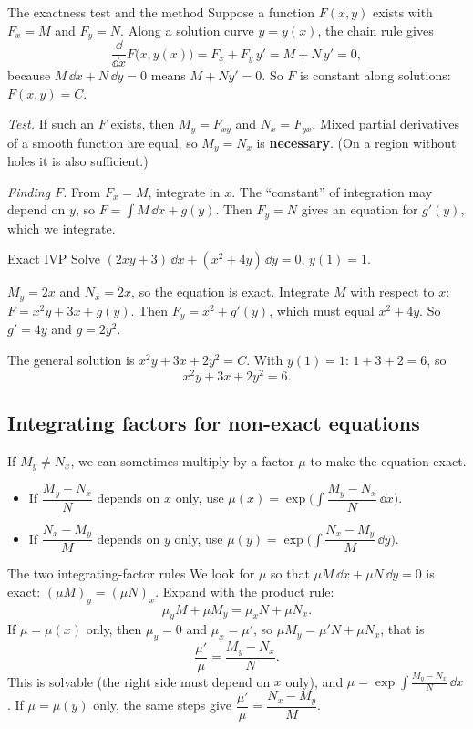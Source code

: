\begin{derivbox}{The exactness test and the method}
Suppose a function $F(x,y)$ exists with $F_x = M$ and $F_y = N$. Along a solution curve $y = y(x)$, the chain rule gives
\[ \frac{\dd}{\dd x}F\big(x,y(x)\big) = F_x + F_y\,y' = M + N\,y' = 0, \]
because $M\,\dd x + N\,\dd y = 0$ means $M + Ny' = 0$. So $F$ is constant along solutions: $F(x,y)=C$.

\emph{Test.} If such an $F$ exists, then $M_y = F_{xy}$ and $N_x = F_{yx}$. Mixed partial derivatives of a smooth function are equal, so $M_y = N_x$ is \textbf{necessary}. (On a region without holes it is also sufficient.)

\emph{Finding $F$.} From $F_x = M$, integrate in $x$. The ``constant'' of integration may depend on $y$, so $F = \int M\,\dd x + g(y)$. Then $F_y = N$ gives an equation for $g'(y)$, which we integrate.
\end{derivbox}

\begin{examplebox}{Exact IVP}
Solve $(2xy+3)\,\dd x + (x^2+4y)\,\dd y = 0$, \quad $y(1)=1$.

$M_y = 2x$ and $N_x = 2x$, so the equation is exact. Integrate $M$ with respect to $x$:
$F = x^2y + 3x + g(y)$. Then $F_y = x^2 + g'(y)$, which must equal $x^2 + 4y$. So $g' = 4y$ and $g = 2y^2$.

The general solution is $x^2y + 3x + 2y^2 = C$. With $y(1)=1$: $1+3+2 = 6$, so
\[ x^2y + 3x + 2y^2 = 6. \]
\end{examplebox}

\subsection*{Integrating factors for non-exact equations}

If $M_y \neq N_x$, we can sometimes multiply by a factor $\mu$ to make the equation exact.
\begin{itemize}
  \item If $\dfrac{M_y - N_x}{N}$ depends on $x$ only, use $\mu(x) = \exp\!\Big(\displaystyle\int \dfrac{M_y-N_x}{N}\,\dd x\Big)$.
  \item If $\dfrac{N_x - M_y}{M}$ depends on $y$ only, use $\mu(y) = \exp\!\Big(\displaystyle\int \dfrac{N_x-M_y}{M}\,\dd y\Big)$.
\end{itemize}

\begin{derivbox}{The two integrating-factor rules}
We look for $\mu$ so that $\mu M\,\dd x + \mu N\,\dd y = 0$ is exact: $(\mu M)_y = (\mu N)_x$. Expand with the product rule:
\[ \mu_yM + \mu M_y = \mu_xN + \mu N_x. \]
If $\mu = \mu(x)$ only, then $\mu_y = 0$ and $\mu_x = \mu'$, so $\mu M_y = \mu'N + \mu N_x$, that is
\[ \frac{\mu'}{\mu} = \frac{M_y - N_x}{N}. \]
This is solvable (the right side must depend on $x$ only), and $\mu = \exp\int\frac{M_y-N_x}{N}\,\dd x$. If $\mu=\mu(y)$ only, the same steps give $\dfrac{\mu'}{\mu} = \dfrac{N_x - M_y}{M}$.
\end{derivbox}

